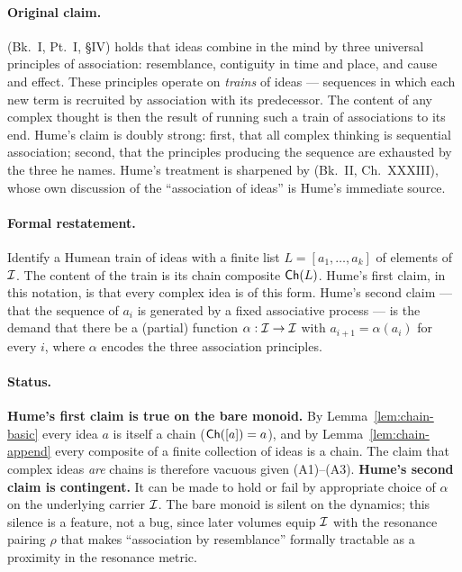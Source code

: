 \paragraph{Original claim.}
\cite{Hume1739} (Bk.~I, Pt.~I, \S IV) holds that ideas combine in the
mind by three universal principles of association: resemblance,
contiguity in time and place, and cause and effect.  These principles
operate on \emph{trains} of ideas --- sequences in which each new term is
recruited by association with its predecessor.  The content of any
complex thought is then the result of running such a train of associations
to its end.  Hume's claim is doubly strong: first, that all complex
thinking is sequential association; second, that the principles
producing the sequence are exhausted by the three he names.  Hume's
treatment is sharpened by \cite{Locke1690} (Bk.~II, Ch.~XXXIII), whose
own discussion of the ``association of ideas'' is Hume's immediate source.

\paragraph{Formal restatement.}
Identify a Humean train of ideas with a finite list $L = [a_1, \dots,
a_k]$ of elements of $\mathcal{I}$.  The content of the train is its chain
composite $\mathsf{Ch}(L)$.  Hume's first claim, in this notation, is that
every complex idea is of this form.  Hume's second claim --- that the
sequence of $a_i$ is generated by a fixed associative process --- is the
demand that there be a (partial) function $\alpha : \mathcal{I} \to \mathcal{I}$
with $a_{i+1} = \alpha(a_i)$ for every $i$, where $\alpha$ encodes the
three association principles.

\paragraph{Status.}
\textbf{Hume's first claim is true on the bare monoid.}  By
Lemma~\ref{lem:chain-basic} every idea $a$ is itself a chain
($\mathsf{Ch}([a]) = a$), and by Lemma~\ref{lem:chain-append} every composite
of a finite collection of ideas is a chain.  The claim that complex
ideas \emph{are} chains is therefore vacuous given (A1)--(A3).
\textbf{Hume's second claim is contingent.}  It can be made to hold or
fail by appropriate choice of $\alpha$ on the underlying carrier $\mathcal{I}$.
The bare monoid is silent on the dynamics; this silence is a feature, not
a bug, since later volumes equip $\mathcal{I}$ with the resonance pairing
$\rho$ that makes ``association by resemblance'' formally tractable as a
proximity in the resonance metric.


